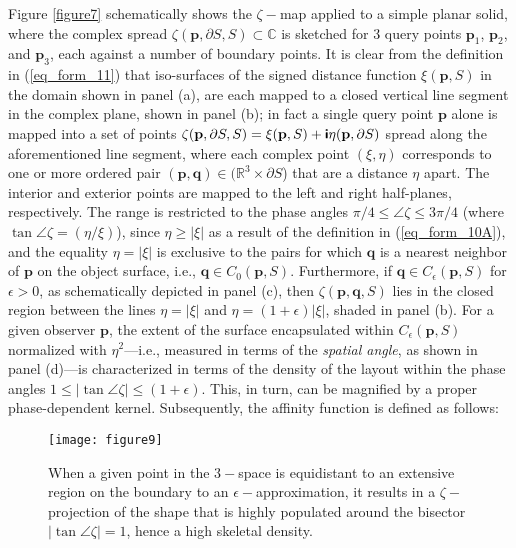 \documentclass[article]{gmp2014}
\theoremstyle{definition}
\newcommand{\ii}{\text{\textsf{\textbf{i}}}}
\begin{document}
Figure \ref{figure7} schematically shows the $\zeta-$map applied to a simple planar solid, where the complex spread $\zeta(\mathbf{p}, \partial S, S) \subset \mathds{C}$ is sketched for 3 query points $\mathbf{p}_1$, $\mathbf{p}_2$, and $\mathbf{p}_3$, each against a number of boundary points. It is clear from the definition in (\ref{eq_form_11}) that iso-surfaces of the signed distance function $\xi(\mathbf{p}, S)$ in the domain shown in panel (a), are each mapped to a closed vertical line segment in the complex plane, shown in panel (b); in fact a single query point $\mathbf{p}$ alone is mapped into a set of points $\zeta(\mathbf{p}, \partial S, S) = \xi(\mathbf{p}, S) + \ii \eta(\mathbf{p}, \partial S)$ spread along the aforementioned line segment, where each complex point $(\xi, \eta)$ corresponds to one or more ordered pair $(\mathbf{p}, \mathbf{q}) \in (\mathds{R}^3 \times \partial S$) that are a distance $\eta$ apart. The interior and exterior points are mapped to the left and right half-planes, respectively. The range is restricted to the phase angles $\pi/4 \leq \angle \zeta \leq 3\pi/4$ (where $\tan\angle\zeta = (\eta/\xi)$), since $\eta \geq |\xi|$ as a result of the definition in (\ref{eq_form_10A}), and the equality $\eta = |\xi|$ is exclusive to the pairs for which $\mathbf{q}$ is a nearest neighbor of $\mathbf{p}$ on the object surface, i.e., $\mathbf{q} \in C_0(\mathbf{p}, S)$. Furthermore, if $\mathbf{q} \in C_\epsilon(\mathbf{p}, S)$ for $\epsilon > 0$, as schematically depicted in panel (c), then $\zeta(\mathbf{p}, \mathbf{q}, S)$ lies in the closed region between the lines $\eta = |\xi|$ and $\eta = (1+\epsilon)|\xi|$, shaded in panel (b). For a given observer $\mathbf{p}$, the extent of the surface encapsulated within $C_\epsilon(\mathbf{p}, S)$ normalized with $\eta^2$---i.e., measured in terms of the {\it spatial angle}, as shown in panel (d)---is characterized in terms of the density of the layout within the phase angles $1\leq |\tan \angle \zeta| \leq (1+ \epsilon)$. This, in turn, can be magnified by a proper phase-dependent kernel. Subsequently, the affinity function is defined as follows:

%
\begin{figure*}
    \centering
    \texttt{[image: figure9]}
    \caption{When a given point in the $3-$space is equidistant to an extensive region on the boundary to an $\epsilon-$approximation, it results in a $\zeta-$projection of the shape that is highly populated around the bisector $|\tan \angle \zeta| = 1$, hence a high skeletal density.} \label{figure9}
\end{figure*}
%
\end{document}
